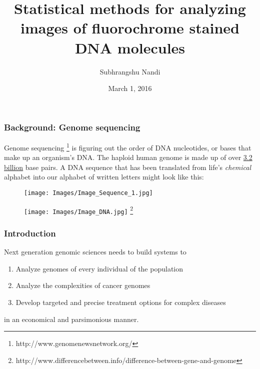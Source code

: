 \documentclass[10pt,dvipsnames,table]{beamer}
\title[Statistics for fluoroscanning]{Statistical methods for analyzing images of fluorochrome stained DNA molecules}
\author{Subhrangshu Nandi}
\institute[Prelim exam]{Preliminary Exam \\
Department of Statistics \\
University of Wisconsin-Madison}
\date{March 1, 2016}
\begin{document}
\setlength{\baselineskip}{16truept}

\frame{\maketitle}

\begin{frame}
\frametitle{Background: Genome sequencing}
Genome sequencing \footnote{http://www.genomenewsnetwork.org/} is figuring out the order of DNA nucleotides, or bases that make up an organism's DNA. The haploid human genome is made up of over {\underline{3.2 billion}} base pairs. A DNA sequence that has been translated from life's {\emph{chemical}} alphabet into our alphabet of written letters might look like this:
\begin{figure}[H]
\texttt{[image: Images/Image\_Sequence\_1.jpg]}
\end{figure}

\begin{figure}[H]
\texttt{[image: Images/Image\_DNA.jpg]} \footnote{http://www.differencebetween.info/difference-between-gene-and-genome}
\end{figure}

\note{}
\end{frame}

\begin{frame}
\frametitle{Introduction}
{\Large{
Next generation genomic sciences needs to build systems to
\begin{enumerate}
\item Analyze genomes of every individual of the population
\item Analyze the complexities of cancer genomes
\item Develop targeted and precise treatment options for complex diseases
\end{enumerate}
in an economical and parsimonious manner.
}}
\end{frame}
\end{document}
